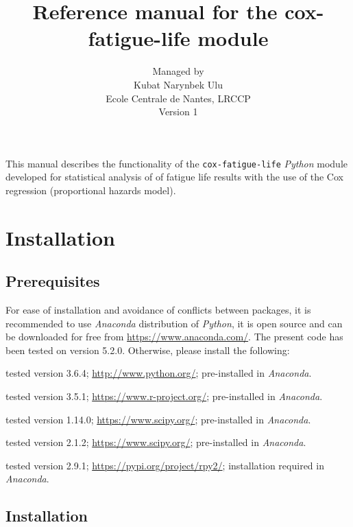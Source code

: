 \documentclass[twoside,a4paper]{refart}
\title{Reference manual for the cox-fatigue-life module}
\author{Managed by \\
Kubat Narynbek Ulu \\
Ecole Centrale de Nantes, LRCCP   \\
Version 1}
\date{}
\begin{document}
\maketitle




This manual describes the functionality of the \texttt{cox-fatigue-life} \textit{Python} module developed for statistical analysis of of fatigue life results with the use of the Cox regression (proportional hazards model). 

\tableofcontents

\newpage



\section{Installation}

\subsection{Prerequisites}

For ease of installation and avoidance of conflicts between packages, it is recommended to use \textit{Anaconda} distribution of \textit{Python}, it is open source and can be downloaded for free from \url{https://www.anaconda.com/}. The present code has been tested on version 5.2.0.
Otherwise, please install the following:

tested version 3.6.4; \url{http://www.python.org/}; pre-installed in \textit{Anaconda}.

tested version 3.5.1; \url{https://www.r-project.org/}; pre-installed in \textit{Anaconda}.

tested version 1.14.0; \url{https://www.scipy.org/}; pre-installed in \textit{Anaconda}.

tested version 2.1.2; \url{https://www.scipy.org/}; pre-installed in \textit{Anaconda}.

tested version 2.9.1; \url{https://pypi.org/project/rpy2/}; installation required in \textit{Anaconda}.

\subsection{Installation}
\end{document}
